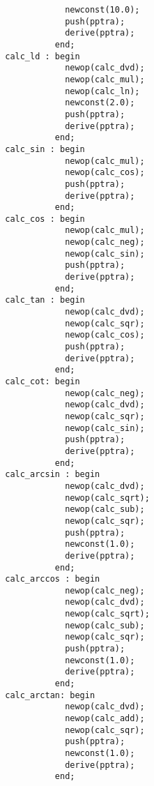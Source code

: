 \begin{refsection}
\begin{lstlisting}
                          newconst(10.0);
                          push(pptra);
                          derive(pptra);
                        end;
              calc_ld : begin
                          newop(calc_dvd);
                          newop(calc_mul);
                          newop(calc_ln);
                          newconst(2.0);
                          push(pptra);
                          derive(pptra);
                        end;
              calc_sin : begin
                          newop(calc_mul);
                          newop(calc_cos);
                          push(pptra);
                          derive(pptra);
                        end;
              calc_cos : begin
                          newop(calc_mul);
                          newop(calc_neg);
                          newop(calc_sin);
                          push(pptra);
                          derive(pptra);
                        end;
              calc_tan : begin
                          newop(calc_dvd);
                          newop(calc_sqr);
                          newop(calc_cos);
                          push(pptra);
                          derive(pptra);
                        end;
              calc_cot: begin
                          newop(calc_neg);
                          newop(calc_dvd);
                          newop(calc_sqr);
                          newop(calc_sin);
                          push(pptra);
                          derive(pptra);
                        end;
              calc_arcsin : begin
                          newop(calc_dvd);
                          newop(calc_sqrt);
                          newop(calc_sub);
                          newop(calc_sqr);
                          push(pptra);
                          newconst(1.0);
                          derive(pptra);
                        end;
              calc_arccos : begin
                          newop(calc_neg);
                          newop(calc_dvd);
                          newop(calc_sqrt);
                          newop(calc_sub);
                          newop(calc_sqr);
                          push(pptra);
                          newconst(1.0);
                          derive(pptra);
                        end;
              calc_arctan: begin
                          newop(calc_dvd);
                          newop(calc_add);
                          newop(calc_sqr);
                          push(pptra);
                          newconst(1.0);
                          derive(pptra);
                        end;

\end{lstlisting}
\end{refsection}
